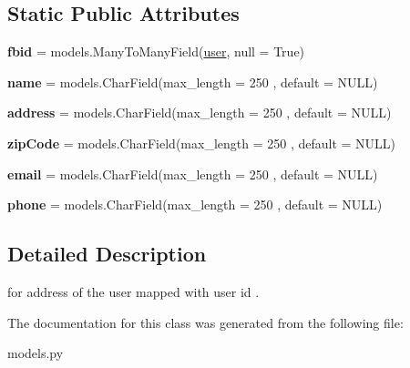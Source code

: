 \subsection*{Static Public Attributes}
\begin{DoxyCompactItemize}
\item 
\mbox{\label{classmessengerbot_1_1models_1_1address_a85dff36c313a4437aa39e7f2a83589ed}} 
{\bfseries fbid} = models.\+Many\+To\+Many\+Field(\hyperlink{classmessengerbot_1_1models_1_1user}{user}, null = True)
\item 
\mbox{\label{classmessengerbot_1_1models_1_1address_a549a6273b46ccb95313170df8a2f4223}} 
{\bfseries name} = models.\+Char\+Field(max\+\_\+length = 250 , default = \textquotesingle{}N\+U\+LL\textquotesingle{})
\item 
\mbox{\label{classmessengerbot_1_1models_1_1address_aa4c0c585dc31e3c740efcc53e07605cc}} 
{\bfseries address} = models.\+Char\+Field(max\+\_\+length = 250 , default = \textquotesingle{}N\+U\+LL\textquotesingle{})
\item 
\mbox{\label{classmessengerbot_1_1models_1_1address_aebe139c4196e462074da0a624bb6219c}} 
{\bfseries zip\+Code} = models.\+Char\+Field(max\+\_\+length = 250 , default = \textquotesingle{}N\+U\+LL\textquotesingle{})
\item 
\mbox{\label{classmessengerbot_1_1models_1_1address_a4ebf976d2d102ed86f8df2052367ece0}} 
{\bfseries email} = models.\+Char\+Field(max\+\_\+length = 250 , default = \textquotesingle{}N\+U\+LL\textquotesingle{})
\item 
\mbox{\label{classmessengerbot_1_1models_1_1address_a58db9d45a5fb58b321296870618deb7f}} 
{\bfseries phone} = models.\+Char\+Field(max\+\_\+length = 250 , default = \textquotesingle{}N\+U\+LL\textquotesingle{})
\end{DoxyCompactItemize}


\subsection{Detailed Description}
\begin{DoxyVerb}for address of the user mapped with user id . \end{DoxyVerb}
 

The documentation for this class was generated from the following file\+:\begin{DoxyCompactItemize}
\item 
models.\+py\end{DoxyCompactItemize}
